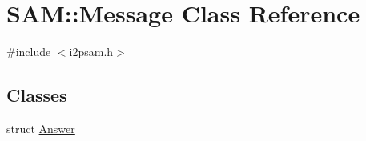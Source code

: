 \hypertarget{class_s_a_m_1_1_message}{}\section{S\+A\+M\+:\+:Message Class Reference}
\label{class_s_a_m_1_1_message}


{\ttfamily \#include $<$i2psam.\+h$>$}

\subsection*{Classes}
\begin{DoxyCompactItemize}
\item 
struct \hyperlink{struct_s_a_m_1_1_message_1_1_answer}{Answer}
\end{DoxyCompactItemize}
